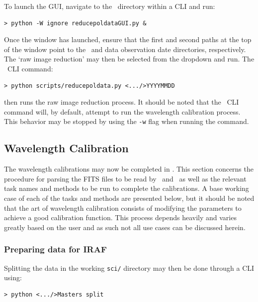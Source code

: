 To launch the \gls{GUI}, navigate to the \polsalt\ directory within a \gls{CLI} and run:

\begin{verbatim}> python -W ignore reducepoldataGUI.py &\end{verbatim}

\noindent Once the window has launched, ensure that the first and second paths at the top of the window point to the \polsalt\ and data observation date directories, respectively. The `raw image reduction' may then be selected from the dropdown and run. The \polsalt\ \gls{CLI} command:

\begin{verbatim}> python scripts/reducepoldata.py <.../>YYYYMMDD\end{verbatim}

\noindent then runs the raw image reduction process. It should be noted that the \polsalt\ \gls{CLI} command will, by default, attempt to run the wavelength calibration process. This behavior may be stopped by using the \texttt{-w} flag when running the command.
\prgph



\subsection{Wavelength Calibration} \label{subsec:reduc_wav}

The wavelength calibrations may now be completed in \iraf. This section concerns the procedure for parsing the \gls{FITS} files to be read by \iraf\ and \polsalt\ as well as the relevant task names and methods to be run to complete the calibrations. A base working case of each of the tasks and methods are presented below, but it should be noted that the art of wavelength calibration consists of modifying the parameters to achieve a good calibration function. This process depends heavily and varies greatly based on the user and as such not all use cases can be discussed herein.

\subsubsection{Preparing data for IRAF}

Splitting the data in the working \texttt{sci/} directory may then be done through a \gls{CLI} using:

\begin{verbatim}> python <.../>Masters split\end{verbatim}

